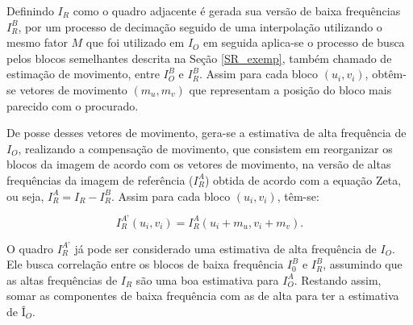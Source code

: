 Definindo $I_R$ como o quadro adjacente é gerada sua versão de baixa frequências $I_R^B$, por um processo de decimação seguido de uma interpolação utilizando o mesmo fator $M$ que foi utilizado em $I_O$ em seguida aplica-se o processo de busca pelos blocos semelhantes descrita na Seção \ref{SR_exemp}, também chamado de estimação de movimento, entre $I_O^B$ e $I_R^B$. Assim para cada bloco $(u_i,v_i)$, obtêm-se vetores de movimento $(m_u,m_v)$ que representam a posição do bloco mais parecido com o procurado. 

    De posse desses vetores de movimento, gera-se a estimativa de alta frequência de $I_O$, realizando a compensação de movimento, que consistem em reorganizar os blocos da imagem de acordo com os vetores de movimento, na versão de altas frequências da imagem de referência ($I_R^{A}$) obtida de acordo com a equação Zeta, ou seja, $I_R^{A} = I_R - I_R^B$. Assim para cada bloco $(u_i,v_i)$, têm-se:

\begin{equation}
I_R^{A’} (u_i,v_i) = I_R^A(u_i+m_u, v_i+m_v).
\end{equation}


O quadro $I_R^{A’} $ já pode ser considerado uma estimativa de alta frequência de $I_O$. Ele busca correlação entre os blocos de baixa frequência $I_0^B$ e $I_R^B$, assumindo que as altas frequências de $I_R$ são uma boa estimativa para $I_O^A$. Restando assim, somar as componentes de baixa frequência com as de alta para ter a estimativa de $Î_O$.